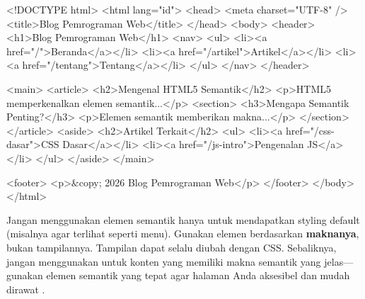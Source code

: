 \begin{webcode}[language=HTML, caption={Struktur halaman lengkap dengan elemen semantik}]
<!DOCTYPE html>
<html lang="id">
<head>
  <meta charset="UTF-8" />
  <title>Blog Pemrograman Web</title>
</head>
<body>
  <header>
    <h1>Blog Pemrograman Web</h1>
    <nav>
      <ul>
        <li><a href="/">Beranda</a></li>
        <li><a href="/artikel">Artikel</a></li>
        <li><a href="/tentang">Tentang</a></li>
      </ul>
    </nav>
  </header>

  <main>
    <article>
      <h2>Mengenal HTML5 Semantik</h2>
      <p>HTML5 memperkenalkan elemen semantik...</p>
      <section>
        <h3>Mengapa Semantik Penting?</h3>
        <p>Elemen semantik memberikan makna...</p>
      </section>
    </article>
    <aside>
      <h2>Artikel Terkait</h2>
      <ul>
        <li><a href="/css-dasar">CSS Dasar</a></li>
        <li><a href="/js-intro">Pengenalan JS</a></li>
      </ul>
    </aside>
  </main>

  <footer>
    <p>&copy; 2026 Blog Pemrograman Web</p>
  </footer>
</body>
</html>
\end{webcode}

\begin{catatan}
Jangan menggunakan elemen semantik hanya untuk mendapatkan styling default (misalnya  agar terlihat seperti menu). Gunakan elemen berdasarkan \textbf{maknanya}, bukan tampilannya. Tampilan dapat selalu diubah dengan CSS. Sebaliknya, jangan menggunakan  untuk konten yang memiliki makna semantik yang jelas---gunakan elemen semantik yang tepat agar halaman Anda aksesibel dan mudah dirawat \cite{webdevHtml}.
\end{catatan}

